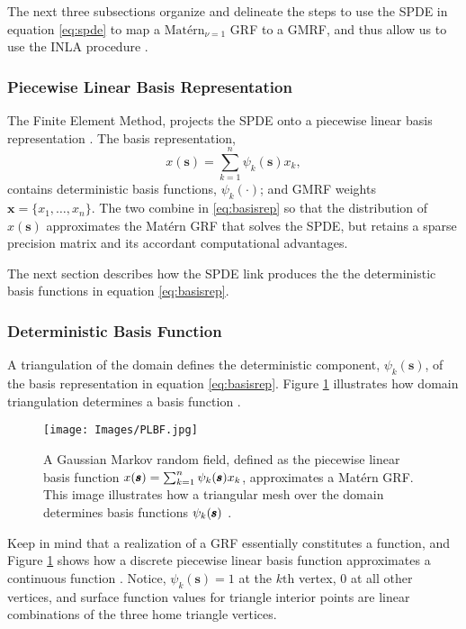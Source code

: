 The next three subsections organize and delineate the steps to use the SPDE in equation \ref{eq:spde} to map a $\text{Mat\'ern}_{\nu = 1}$ GRF to a GMRF, and thus allow us to use the INLA procedure \citep{Lindgren2011}.

\subsubsection{Piecewise Linear Basis Representation}
The Finite Element Method, projects the SPDE onto a piecewise linear basis representation \citep{Simpson2012}. The basis representation,
\begin{equation} \label{eq:basisrep}
x(\pmb{s}) = \sum_{k=1}^{n} \psi_{k}(\pmb{s})x_{k},
\end{equation}
contains deterministic basis functions, $\psi_{k}(\cdot)$; and GMRF weights $\pmb{x} = \{x_{1},\dots,x_{n}\}$. The two combine in \ref{eq:basisrep} so that the distribution of $x(\pmb{s})$ approximates the Mat\'ern GRF that solves the SPDE, but retains a sparse precision matrix and its accordant computational advantages. 

The next section describes how the SPDE link produces the the deterministic basis functions in equation \ref{eq:basisrep}.

\subsubsection{Deterministic Basis Function}

A triangulation of the domain defines the deterministic component, $\psi_{k}(\pmb{s})$, of the basis representation in equation \ref{eq:basisrep}. Figure \ref{fig:basis} illustrates how domain triangulation determines a basis function \citep{Simpson2012}.
  \begin{figure}[H]
	\centering 
	\texttt{[image: Images/PLBF.jpg]}
	\caption{A Gaussian Markov random field, defined as the piecewise linear basis function $  x(\pmb{s}) = \sum_{k=1}^{n} \protect\psi_{k}(\pmb{s})x_{k}$, approximates a Mat\'ern GRF. This image illustrates how a triangular mesh over the domain determines basis functions $\protect\psi_{k}(\pmb{s})$ 
	\citep{Simpson2012}.}
	\label{fig:basis}
	\end{figure}
Keep in mind that a realization of a GRF essentially constitutes a function, and Figure \ref{fig:basis} shows how a discrete piecewise linear basis function approximates a continuous function \citep{Simpson2012}. Notice, $\psi_{k}(\pmb{s}) = 1$ at the $k\text{th}$ vertex, $0$ at all other vertices, and surface function values for triangle interior points are linear combinations of the three home triangle vertices.
 
